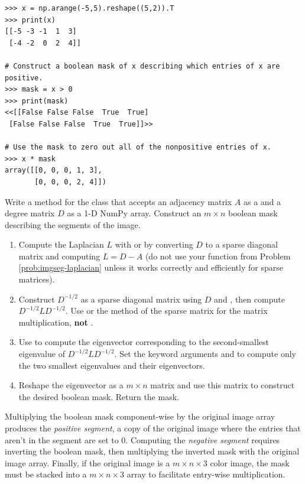 \begin{lstlisting}
>>> x = np.arange(-5,5).reshape((5,2)).T
>>> print(x)
[[-5 -3 -1  1  3]
 [-4 -2  0  2  4]]

# Construct a boolean mask of x describing which entries of x are positive.
>>> mask = x > 0
>>> print(mask)
<<[[False False False  True  True]
 [False False False  True  True]]>>

# Use the mask to zero out all of the nonpositive entries of x.
>>> x * mask
array([[0, 0, 0, 1, 3],
       [0, 0, 0, 2, 4]])
\end{lstlisting}

\begin{problem}
Write a method for the  class that accepts an adjacency matrix $A$ as a  and a degree matrix $D$ as a 1-D NumPy array.
Construct an $m\times n$ boolean mask describing the segments of the image.
\begin{enumerate}
    \item Compute the Laplacian $L$ with  or by converting $D$ to a sparse diagonal matrix and computing $L = D - A$ (do not use your function from Problem \ref{prob:imgseg-laplacian} unless it works correctly and efficiently for sparse matrices).

    \item Construct $D^{-1/2}$ as a sparse diagonal matrix using $D$ and , then compute $D^{-1/2}LD^{-1/2}$.
    Use  or the  method of the sparse matrix for the matrix multiplication, \textbf{not} .

    \item Use  to compute the eigenvector corresponding to the second-smallest eigenvalue of $D^{-1/2} L D^{-1/2}$.
    Set the keyword arguments  and  to compute only the two smallest eigenvalues and their eigenvectors.

    \item Reshape the eigenvector as a $m\times n$ matrix and use this matrix to construct the desired boolean mask.
    Return the mask.
\end{enumerate}
\label{prob:imgseg-compute-mask}
\end{problem}

Multiplying the boolean mask component-wise by the original image array produces the \emph{positive segment}, a copy of the original image where the entries that aren't in the segment are set to $0$.
Computing the \emph{negative segment} requires inverting the boolean mask, then multiplying the inverted mask with the original image array.
Finally, if the original image is a $m \times n \times 3$ color image, the mask must be stacked into a $m \times n \times 3$ array to facilitate entry-wise multiplication.

